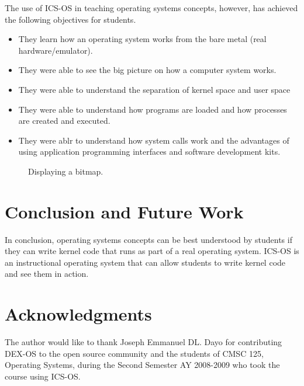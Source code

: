 \documentclass{acm_proc_article-sp}
\begin{document}
The use of ICS-OS in teaching operating systems concepts, however, has 
achieved the following objectives for students.
\begin{itemize}
\item{They learn how an operating system works from the bare metal 
(real hardware/emulator).}
\item{They were able to see the big picture on how a computer system works.}
\item{They were able to understand the separation of kernel space and 
user space}
\item{They were able to understand how programs are loaded and how processes 
are created and executed.}
\item{They were ablr to understand how system calls work and the advantages
of using application programming interfaces and software development kits.}
\end{itemize}

\begin{figure}
\centering
{}
\caption{Displaying a bitmap.}
\end{figure}



\section{Conclusion and Future Work}
In conclusion, operating systems concepts can be best understood by students
if they can write kernel code that runs as part of a real operating system. 
ICS-OS is an instructional operating system that can allow students to 
write kernel code and see them in action.


\section{Acknowledgments}
The author would like to thank Joseph Emmanuel DL. Dayo for contributing 
DEX-OS to the open source community and the students of CMSC 125, Operating
Systems, during the Second Semester AY 2008-2009 who took the course 
using ICS-OS.




\balancecolumns
\end{document}
